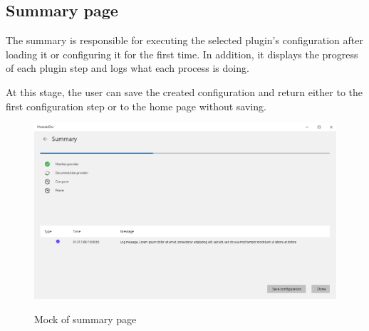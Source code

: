 \pagebreak
\subsection{Summary page}

The summary is responsible for executing the selected plugin's configuration after loading it or configuring it for the first time. In addition, it displays the progress of each plugin step and logs what each process is doing.

At this stage, the user can save the created configuration and return either to the first configuration step or to the home page without saving.

\begin{figure}[H]
    \includegraphics[width=\linewidth]{img/mockSummary.png}
    \label{fig:summaryPage}
    \caption{Mock of summary page}
\end{figure}